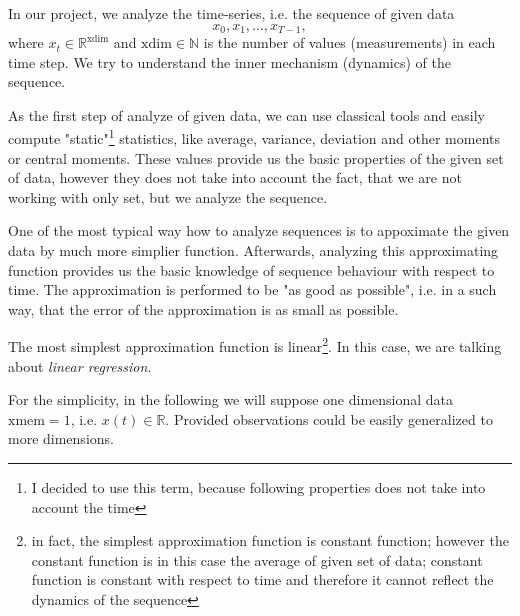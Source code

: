  In our project, we analyze the time-series, i.e. the sequence of given data
 \begin{equation}
  \label{eq:timeseries}
	x_0, x_1, \dots, x_{T-1},
 \end{equation}
 where $x_t \in \mathbb{R}^{\mathrm{xdim}}$ and $\mathrm{xdim} \in \mathbb{N}$ is the number of values (measurements) in each time step. 
 We try to understand the inner mechanism (dynamics) of the sequence. \newline
 
 As the first step of analyze of given data, we can use classical tools and easily compute "static"\footnote{I decided to use this term, because following properties does not take into account the time} statistics, like average, variance, deviation and other moments or central moments.
 These values provide us the basic properties of the given set of data, however they does not take into account the fact, that we are not working with only set, but we analyze the sequence.

 One of the most typical way how to analyze sequences is to appoximate the given data by much more simplier function. Afterwards, analyzing this approximating function provides us the basic knowledge of sequence behaviour with respect to time. 
 The approximation is performed to be "as good as possible", i.e. in a such way, that the error of the approximation is as small as possible.
 
 The most simplest approximation function is linear\footnote{in fact, the simplest approximation function is constant function; however the constant function is in this case the average of given set of data; constant function is constant with respect to time and therefore it cannot reflect the dynamics of the sequence}.
 In this case, we are talking about \emph{linear regression}.
 
 For the simplicity, in the following we will suppose one dimensional data $\mathrm{xmem} = 1$, i.e. $x(t) \in \mathbb{R}$. 
 Provided observations could be easily generalized to more dimensions.
 
